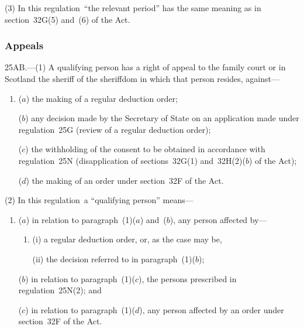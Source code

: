\documentclass[12pt,a4paper]{article}
\begin{document}
(3) In this regulation~“the relevant period” has the same meaning as in section~32G(5) and~(6) of the Act.


\subsubsection[25AB. Appeals]{Appeals}

25AB.---(1)  A qualifying person has a right of appeal to 
the family court  %
or in Scotland the sheriff of the sheriffdom in which that person resides, against—
\begin{enumerate}\item[]
($a$) the making of a regular deduction order;

($b$) any decision made by the 
Secretary of State  %
on an application made under regulation~25G (review of a regular deduction order);

($c$) the withholding of the consent to be obtained in accordance with regulation~25N (disapplication of sections~32G(1) and~32H(2)($b$)  of the Act);

($d$) the making of an order under section~32F of the Act.
\end{enumerate}

(2) In this regulation~a “qualifying person” means—
\begin{enumerate}\item[]
($a$) in relation to paragraph~(1)($a$)  and~($b$), any person affected by—
\begin{enumerate}\item[]
(i) a regular deduction order, or, as the case may be,

(ii) the decision referred to in paragraph~(1)($b$);
\end{enumerate}

($b$) in relation to paragraph~(1)($c$), the persons prescribed in regulation~25N(2); and

($c$) in relation to paragraph~(1)($d$), any person affected by an order under section~32F of the Act.
\end{enumerate}

\end{document}
